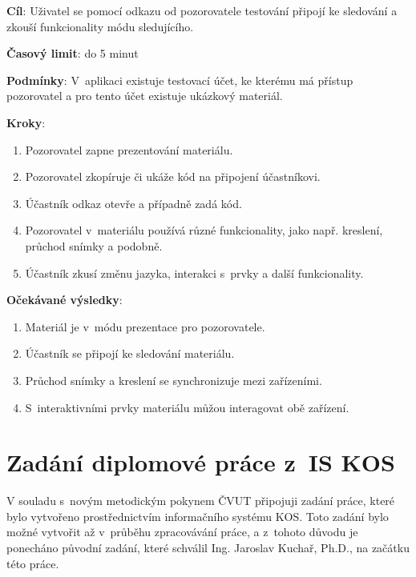\vspace{1em}

\textbf{Cíl}: Uživatel se pomocí odkazu od pozorovatele testování připojí ke sledování a zkouší funkcionality módu sledujícího.

\textbf{Časový limit}: do 5 minut

\textbf{Podmínky}:  V~aplikaci existuje testovací účet, ke kterému má přístup pozorovatel a pro tento účet existuje ukázkový materiál. 

\textbf{Kroky}:

\begin{enumerate}[leftmargin=1.4cm]
    \item Pozorovatel zapne prezentování materiálu.
    \item Pozorovatel zkopíruje či ukáže kód na připojení účastníkovi.
    \item Účastník odkaz otevře a případně zadá kód.
    \item Pozorovatel v~materiálu používá různé funkcionality, jako např. kreslení, průchod snímky a podobně.
    \item Účastník zkusí změnu jazyka, interakci s~prvky a další funkcionality.
\end{enumerate}

\textbf{Očekávané výsledky}:

\begin{enumerate}[leftmargin=1.4cm]
    \item Materiál je v~módu prezentace pro pozorovatele.
    \item Účastník se připojí ke sledování materiálu.
    \item Průchod snímky a kreslení se synchronizuje mezi zařízeními.
    \item S~interaktivními prvky materiálu můžou interagovat obě zařízení.
\end{enumerate}

\chapter{Zadání diplomové práce z~IS KOS}

V souladu s~novým metodickým pokynem ČVUT připojuji zadání práce, které bylo vytvořeno prostřednictvím informačního systému KOS. 
Toto zadání bylo možné vytvořit až v~průběhu zpracovávání práce, a z~tohoto důvodu je ponecháno původní zadání, které schválil Ing. Jaroslav Kuchař, Ph.D., na začátku této práce.

